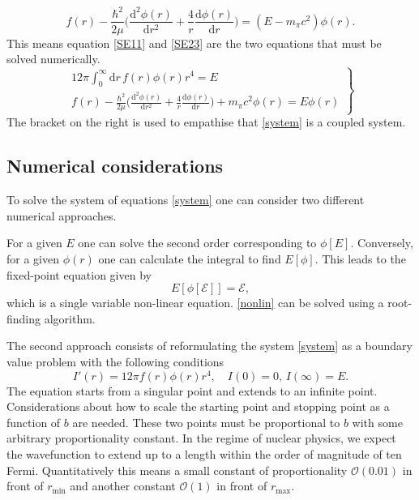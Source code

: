 \begin{equation} \label{SE23}
    f(r) -\frac{\hbar^2}{2\mu}\Big(\frac{\text{d}^2 \phi(r)}{\text{d}r^2}+\frac{4}{r}\frac{\text{d}\phi(r)}{\text{d}r}\Big) = (E-m_\pi c^2)\phi(r).
\end{equation}
This means equation \eqref{SE11} and \eqref{SE23} are the two equations that must be solved numerically.
\begin{equation} \label{system}
 \left.
    \begin{array}{ll}
            12\pi \int_0^\infty  \text{d}r \, f(r) \phi(r) r^4  = E \\
            f(r) -\frac{\hbar^2}{2\mu}\Big(\frac{\text{d}^2 \phi(r)}{\text{d}r^2}+\frac{4}{r}\frac{\text{d}\phi(r)}{\text{d}r}\Big)+m_\pi c^2 \phi(r) = E\phi(r)
    \end{array}
\right \} 
\end{equation}
The bracket on the right is used to empathise that \eqref{system} is a coupled system.
\subsection{Numerical considerations}\label{sec:numericalconsiderations}
To solve the system of equations \eqref{system} one can consider two different numerical approaches. 

For a given $E$ one can solve the second order corresponding to $\phi[E]$. Conversely, for a given $\phi(r)$ one can calculate the integral to find $E[\phi]$. This leads to the fixed-point equation given by
\begin{equation} \label{nonlin}
    E[\phi[\mathcal{E}]] = \mathcal{E},
\end{equation}
which is a single variable non-linear equation. \eqref{nonlin} can be solved using a root-finding algorithm.

The second approach consists of reformulating the system \eqref{system} as a boundary value problem with the following conditions
\begin{equation}
    I'(r) = 12\pi f(r)\phi(r)r^4, \quad I(0)=0, \, I(\infty)=E.
\end{equation}
The equation starts from a singular point and extends to an infinite point. Considerations about how to scale the starting point and stopping point as a function of $b$ are needed. These two points must be proportional to $b$ with some arbitrary proportionality constant. In the regime of nuclear physics, we expect the wavefunction to extend up to a length within the order of magnitude of ten Fermi. Quantitatively this means a small constant of proportionality $\mathcal{O}(0.01)$ in front of $r_\text{min}$ and another constant $\mathcal{O}(1)$ in front of $r_{\text{max}}$.

